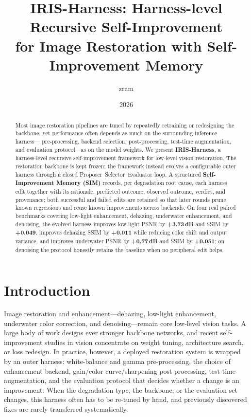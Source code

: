 \documentclass[11pt,letterpaper]{article}
\title{\bfseries IRIS-Harness: Harness-level Recursive Self-Improvement\\
for Image Restoration with Self-Improvement Memory}
\author{zram}
\date{2026}
\begin{document}
\maketitle

\begin{abstract}
Most image restoration pipelines are tuned by repeatedly retraining or redesigning the
backbone, yet performance often depends as much on the surrounding inference harness---
pre-processing, backend selection, post-processing, test-time augmentation, and evaluation
protocol---as on the model weights. We present \textbf{IRIS-Harness}, a harness-level
recursive self-improvement framework for low-level vision restoration. The restoration
backbone is kept frozen; the framework instead evolves a configurable outer harness through
a closed Proposer--Selector--Evaluator loop. A structured \textbf{Self-Improvement Memory
(SIM)} records, per degradation root cause, each harness edit together with its rationale,
predicted outcome, observed outcome, verdict, and provenance; both successful and failed
edits are retained so that later rounds prune known regressions and reuse known improvements
across backends. On four real paired benchmarks covering low-light enhancement, dehazing,
underwater enhancement, and denoising, the evolved harness improves low-light PSNR by
\textbf{+3.73\,dB} and SSIM by \textbf{+0.049}, improves dehazing SSIM by \textbf{+0.011}
while reducing color shift and output variance, and improves underwater PSNR by
\textbf{+0.77\,dB} and SSIM by \textbf{+0.051}; on denoising the protocol honestly retains
the baseline when no peripheral edit helps.
\end{abstract}

\section{Introduction}
\label{sec:intro}

Image restoration and enhancement---dehazing, low-light enhancement, underwater color
correction, and denoising---remain core low-level vision tasks. A large body of work designs
ever stronger backbone networks, and recent self-improvement studies in vision concentrate
on weight tuning, architecture search, or loss redesign. In practice, however, a deployed
restoration system is wrapped by an outer harness: white-balance and gamma pre-processing,
the choice of enhancement backend, gain/color-curve/sharpening post-processing, test-time
augmentation, and the evaluation protocol that decides whether a change is an improvement.
When the degradation type, the backbone, or the evaluation set changes, this harness often
has to be re-tuned by hand, and previously discovered fixes are rarely transferred
systematically.
\end{document}

